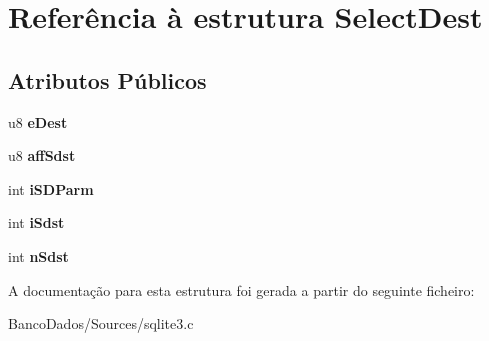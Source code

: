 \hypertarget{struct_select_dest}{\section{Referência à estrutura Select\-Dest}
\label{struct_select_dest}
}
\subsection*{Atributos Públicos}
\begin{DoxyCompactItemize}
\item 
\hypertarget{struct_select_dest_a779c1809acadd15898db0b20e31cc23f}{u8 {\bfseries e\-Dest}}\label{struct_select_dest_a779c1809acadd15898db0b20e31cc23f}

\item 
\hypertarget{struct_select_dest_a74a21e5d3e2f7decbbea775322cd9288}{u8 {\bfseries aff\-Sdst}}\label{struct_select_dest_a74a21e5d3e2f7decbbea775322cd9288}

\item 
\hypertarget{struct_select_dest_ad30d63b2b7216a533a5ea476412664aa}{int {\bfseries i\-S\-D\-Parm}}\label{struct_select_dest_ad30d63b2b7216a533a5ea476412664aa}

\item 
\hypertarget{struct_select_dest_adbc1c5f38b8c95da1d05e8c25dee400f}{int {\bfseries i\-Sdst}}\label{struct_select_dest_adbc1c5f38b8c95da1d05e8c25dee400f}

\item 
\hypertarget{struct_select_dest_aa4e7438446ef26231f7426edfda13e19}{int {\bfseries n\-Sdst}}\label{struct_select_dest_aa4e7438446ef26231f7426edfda13e19}

\end{DoxyCompactItemize}


A documentação para esta estrutura foi gerada a partir do seguinte ficheiro\-:\begin{DoxyCompactItemize}
\item 
Banco\-Dados/\-Sources/sqlite3.\-c\end{DoxyCompactItemize}
